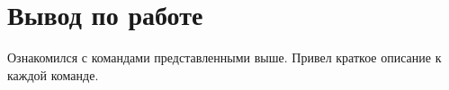\documentclass[a4paper,14pt]{extarticle}
\begin{document}
\section{Вывод по работе}
Ознакомился с командами представленными выше. Привел краткое описание к каждой команде.


% 
% 
% 
% 
% 
% 
%
%
%  
%  
%  
%
\end{document}
